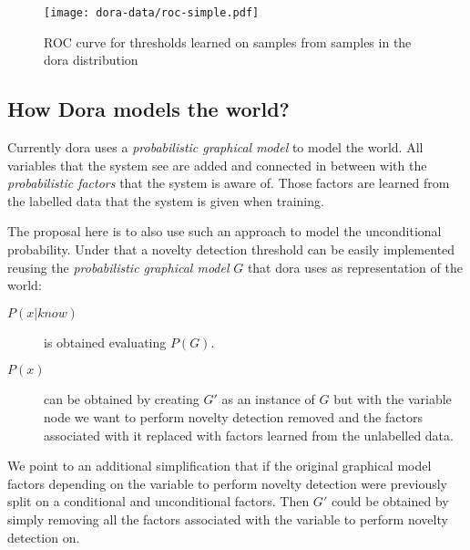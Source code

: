 \documentclass[a4paper]{article}
\begin{document}



\begin{figure}[h]
\centering
\texttt{[image: dora-data/roc-simple.pdf]}
\caption{ROC curve for thresholds learned on samples from samples in the dora distribution}
\label{fig:dora-data-simple}
\end{figure}





\clearpage
\subsection{How Dora models the world?}
\label{sec:dora-models}

Currently dora uses a \emph{probabilistic graphical model} to model the world.
All variables that the system see are added and connected in between with the
\emph{probabilistic factors} that the system is aware of.
Those factors are learned from the labelled data that the system is given when
training.

The proposal here is to also use such an approach to model the unconditional
probability.
Under that a novelty detection threshold can be easily implemented
reusing the \emph{probabilistic graphical model} $G$ that dora uses as
representation of the world:
\begin{description}
\item[$P(x|know)$] is obtained evaluating $P(G)$.
\item[$P(x)$] can be obtained by creating $G'$ as an instance of $G$ but with the
variable node we want to perform novelty detection removed and the factors associated
with it replaced with factors learned from the unlabelled data.
\end{description}

We point to an additional simplification that if the original graphical model factors
depending on the variable to perform novelty detection were previously split on a
conditional and unconditional factors. Then $G'$ could be obtained by simply removing
all the factors associated with the variable to perform novelty detection on.


\cleardoublepage
{}
{}



\end{document}
